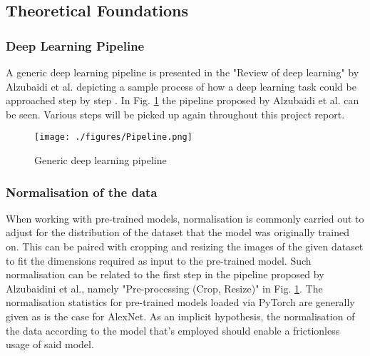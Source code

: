\subsection{Theoretical Foundations}\label{foundations}


\subsubsection{Deep Learning Pipeline}
A generic deep learning pipeline is presented in the "Review of deep learning" by Alzubaidi et al. depicting a sample process of how a deep learning task could be approached step by step \citep{alzubaidi2021review}. In Fig. \ref{fig:pipeline} the pipeline proposed by Alzubaidi et al. can be seen. Various steps will be picked up again throughout this project report.
\begin{figure}[h]
	\centering
	\texttt{[image: ./figures/Pipeline.png]}
	\caption{Generic deep learning pipeline}
	\label{fig:pipeline}
\end{figure}



\subsubsection{Normalisation of the data}
When working with pre-trained models, normalisation is commonly carried out to adjust for the distribution of the dataset that the model was originally trained on. This can be paired with cropping and resizing the images of the given dataset to fit the dimensions required as input to the pre-trained model. Such normalisation can be related to the first step in the pipeline proposed by Alzubaidini et al., namely  "Pre-processing (Crop, Resize)" in Fig. \ref{fig:pipeline}. The normalisation statistics for pre-trained models loaded via PyTorch are generally given as is the case for AlexNet\citep{pytorchAlexNet}. As an implicit hypothesis, the normalisation of the data according to the model that's employed should enable a frictionless usage of said model.


